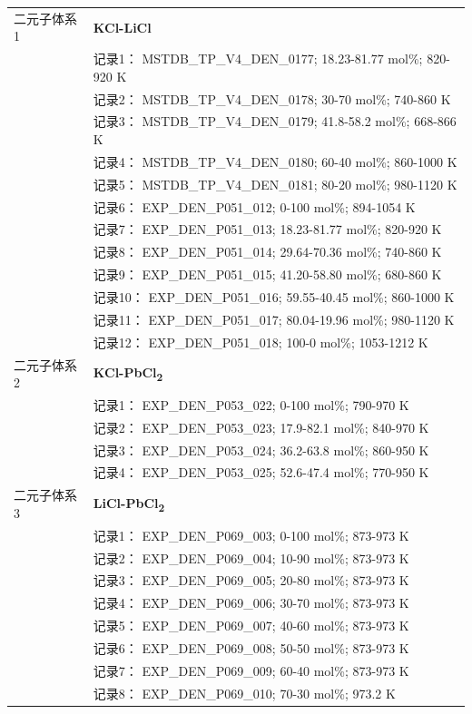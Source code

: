 \documentclass[12pt]{article}
\begin{document}
{\begin{longtable}[]{@{}
  >{\raggedright\arraybackslash}p{}
  >{\raggedright\arraybackslash}p{}@{}}
二元子体系 1  & \textbf{KCl-LiCl} \\
 & 记录1： MSTDB\_TP\_V4\_DEN\_0177; 18.23-81.77 mol\%; 820-920 K \\
 & 记录2： MSTDB\_TP\_V4\_DEN\_0178; 30-70 mol\%; 740-860 K \\
 & 记录3： MSTDB\_TP\_V4\_DEN\_0179; 41.8-58.2 mol\%; 668-866 K \\
 & 记录4： MSTDB\_TP\_V4\_DEN\_0180; 60-40 mol\%; 860-1000 K \\
 & 记录5： MSTDB\_TP\_V4\_DEN\_0181; 80-20 mol\%; 980-1120 K \\
 & 记录6： EXP\_DEN\_P051\_012; 0-100 mol\%; 894-1054 K \\
 & 记录7： EXP\_DEN\_P051\_013; 18.23-81.77 mol\%; 820-920 K \\
 & 记录8： EXP\_DEN\_P051\_014; 29.64-70.36 mol\%; 740-860 K \\
 & 记录9： EXP\_DEN\_P051\_015; 41.20-58.80 mol\%; 680-860 K \\
 & 记录10： EXP\_DEN\_P051\_016; 59.55-40.45 mol\%; 860-1000 K \\
 & 记录11： EXP\_DEN\_P051\_017; 80.04-19.96 mol\%; 980-1120 K \\
 & 记录12： EXP\_DEN\_P051\_018; 100-0 mol\%; 1053-1212 K  \\

二元子体系 2  & \textbf{KCl-PbCl\textsubscript{2}} \\
 & 记录1： EXP\_DEN\_P053\_022; 0-100 mol\%; 790-970 K \\
 & 记录2： EXP\_DEN\_P053\_023; 17.9-82.1 mol\%; 840-970 K \\
 & 记录3： EXP\_DEN\_P053\_024; 36.2-63.8 mol\%; 860-950 K \\
 & 记录4： EXP\_DEN\_P053\_025; 52.6-47.4 mol\%; 770-950 K  \\

二元子体系 3  & \textbf{LiCl-PbCl\textsubscript{2}} \\
 & 记录1： EXP\_DEN\_P069\_003; 0-100 mol\%; 873-973 K \\
 & 记录2： EXP\_DEN\_P069\_004; 10-90 mol\%; 873-973 K \\
 & 记录3： EXP\_DEN\_P069\_005; 20-80 mol\%; 873-973 K \\
 & 记录4： EXP\_DEN\_P069\_006; 30-70 mol\%; 873-973 K \\
 & 记录5： EXP\_DEN\_P069\_007; 40-60 mol\%; 873-973 K \\
 & 记录6： EXP\_DEN\_P069\_008; 50-50 mol\%; 873-973 K \\
 & 记录7： EXP\_DEN\_P069\_009; 60-40 mol\%; 873-973 K \\
 & 记录8： EXP\_DEN\_P069\_010; 70-30 mol\%; 973.2 K  \\


\end{longtable}}
\end{document}
